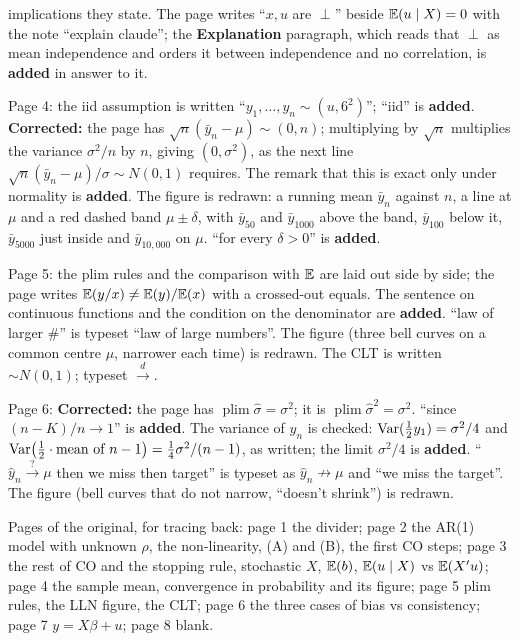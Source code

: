 \documentclass[11pt]{article}
\begin{document}
\begin{transcriptnotes}
        implications they state. The page writes ``$x, u$ are $\perp$'' beside
        $\mathbb{E}(u\mid X) = 0$ with the note ``explain claude''; the \textbf{Explanation}
        paragraph, which reads that $\perp$ as mean independence and orders it
        between independence and no correlation, is \textbf{added} in answer to it.
  \item Page 4: the iid assumption is written ``$y_{1}, \ldots, y_{n} \sim (u,
        6^{2})$''; ``iid'' is \textbf{added}. \textbf{Corrected:} the page has
        $\sqrt{n}(\bar y_{n} - \mu) \sim (0, n)$; multiplying by $\sqrt{n}$ multiplies
        the variance $\sigma^{2}/n$ by $n$, giving $(0, \sigma^{2})$, as the next line
        $\sqrt{n}(\bar y_{n} - \mu)/\sigma \sim N(0,1)$ requires. The remark that
        this is exact only under normality is \textbf{added}. The figure is redrawn:
        a running mean $\bar y_{n}$ against $n$, a line at $\mu$ and a red dashed
        band $\mu \pm \delta$, with $\bar y_{50}$ and $\bar y_{1000}$ above the band,
        $\bar y_{100}$ below it, $\bar y_{5000}$ just inside and $\bar y_{10{,}000}$
        on $\mu$. ``for every $\delta > 0$'' is \textbf{added}.
  \item Page 5: the plim rules and the comparison with $\mathbb{E}$ are laid out side by
        side; the page writes $\mathbb{E}(y/x) \neq \mathbb{E}(y)/\mathbb{E}(x)$ with a crossed-out equals.
        The sentence on continuous functions and the condition on the denominator are
        \textbf{added}. ``law of larger \#'' is typeset ``law of large numbers''. The
        figure (three bell curves on a common centre $\mu$, narrower each time) is
        redrawn. The CLT is written $\sim N(0,1)$; typeset $\xrightarrow{d}$.
  \item Page 6: \textbf{Corrected:} the page has
        $\operatorname*{plim}\hat\sigma = \sigma^{2}$; it is
        $\operatorname*{plim}\hat\sigma^{2} = \sigma^{2}$. ``since $(n-K)/n \to 1$''
        is \textbf{added}. The variance of $\hat y_{n}$ is checked: $\operatorname{Var}(\tfrac12
        y_{1}) = \sigma^{2}/4$ and $\operatorname{Var}\bigl(\tfrac12\cdot\text{mean of } n-1\bigr)
        = \tfrac14\sigma^{2}/(n-1)$, as written; the limit $\sigma^{2}/4$ is
        \textbf{added}. ``$\hat y_{n} \overset{?}{\to} \mu$ then we miss then
        target'' is typeset as $\hat y_{n} \not\to \mu$ and ``we miss the target''.
        The figure (bell curves that do not narrow, ``doesn't shrink'') is redrawn.
  \item Pages of the original, for tracing back: page 1 the divider; page 2 the AR(1)
        model with unknown $\rho$, the non-linearity, (A) and (B), the first CO
        steps; page 3 the rest of CO and the stopping rule, stochastic $X$,
        $\mathbb{E}(b)$, $\mathbb{E}(u\mid X)$ vs $\mathbb{E}(X'u)$; page 4 the sample mean, convergence in
        probability and its figure; page 5 plim rules, the LLN figure, the CLT;
        page 6 the three cases of bias vs consistency; page 7 $y = X\beta + u$;
        page 8 blank.
\end{transcriptnotes}
\end{document}
